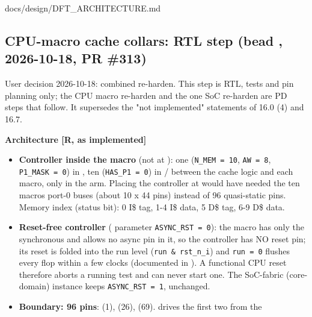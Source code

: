 \begin{relocated}{docs/design/DFT_ARCHITECTURE.md}
\subsection{\texorpdfstring{CPU-macro cache collars: RTL step
(bead , 2026-10-18, PR
\#313)}{CPU-macro cache collars: RTL step (bead , 2026-10-18, PR \#313)}}\label{tm:ch:dft-architecture:1611-cpu-macro-cache-collars-rtl-step-bead-c54a-2026-10-18-pr-313}

User decision 2026-10-18: combined re-harden. This step is RTL, tests
and pin planning only; the CPU macro re-harden and the one SoC re-harden
are PD steps that follow. It supersedes the "not implemented" statements
of 16.0 (4) and 16.7.

\textbf{Architecture {[}R, as implemented{]}}

\begin{itemize}
\tightlist
\item
  \textbf{Controller inside the macro} (not at ): one
   (\texttt{N\_\allowbreak{}MEM\ =\allowbreak{}\ 10},
  \texttt{AW\ =\allowbreak{}\ 8},
  \texttt{P1\_\allowbreak{}MASK\ =\allowbreak{}\ 0}) in
  , ten 
  (\texttt{HAS\_\allowbreak{}P1\ =\allowbreak{}\ 0}) in
   /  between the cache logic and
  each macro, only in the  arm. Placing the controller
  at  would have needed the ten macros\textquotesingle{}
  port-0 buses (about 10 x 44 pins) instead of 96 quasi-static pins.
  Memory index (status  bit): 0 I\$ tag, 1-4 I\$ data, 5 D\$
  tag, 6-9 D\$ data.
\item
  \textbf{Reset-free controller} ( parameter
  \texttt{ASYNC\_\allowbreak{}RST\ =\allowbreak{}\ 0}): the macro has
  only the synchronous  and 
  allows no async pin in it, so the controller has NO reset pin; its
  reset is folded into the run level
  (\texttt{run\ \&\ rst\_\allowbreak{}n\_\allowbreak{}i}) and
  \texttt{run\ =\allowbreak{}\ 0} flushes every flop within a few clocks
  (documented in ). A functional CPU reset therefore
  aborts a running test and can never start one. The SoC-fabric
  (core-domain) instance keeps
  \texttt{ASYNC\_\allowbreak{}RST\ =\allowbreak{}\ 1}, unchanged.
\item
  \textbf{Boundary: 96 pins}:  (1),
   (26),  (69).
   drives the first two from the 

\end{itemize}
\end{relocated}
